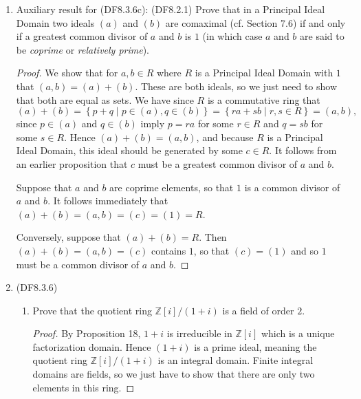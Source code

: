 \documentclass[11pt]{article}
\newcommand{\cbr}[1]{\left\{#1\right\}}
\begin{document}
\begin{enumerate}
\begin{proof}
        We show that $I = (\alpha/d^{\prime})$ for some $d^{\prime}\in D$ (any choice of a denominator would have been fine). It is clear that $(\alpha/d^{\prime})\subseteq I$ since $I$ is an ideal and multiples of $\alpha$ generate the numerators of fractions which appear in $I$. Any element $r/d\in I$ may be written in the form $s\alpha/d$ for some $s\in R$, and then by changing denominators we obtain $r/d = sd^{\prime}/d \cdot \alpha/d^{\prime}$, so that $r/d$ is equivalent to a multiple of $\alpha/d^{\prime}$. This implies that $I\subseteq (\alpha/d^{\prime})$ as desired, meaning that $I$ is a principal ideal. Since $I$ was arbitrary, it follows that $D^{-1}{R}$ is a Principal Ideal Domain.
    \end{proof}
    \item Auxiliary result for (DF8.3.6c): (DF8.2.1) Prove that in a Principal Ideal Domain two ideals $(a)$ and $(b)$ are comaximal (cf. Section 7.6) if and only if a greatest common divisor of $a$ and $b$ is $1$ (in which case $a$ and $b$ are said to be \textit{coprime} or \textit{relatively prime}).
    \begin{proof} We show that for $a,b\in R$ where $R$ is a Principal Ideal Domain with $1$ that $(a,b) = (a) + (b)$. These are both ideals, so we just need to show that both are equal as sets. We have since $R$ is a commutative ring that \[(a)+(b) = \cbr{p+q\mid p\in(a), q\in (b)} =\cbr{ra+sb\mid r,s\in R} = (a,b),\] since $p\in (a)$ and $q\in (b)$ imply $p = ra$ for some $r\in R$ and $q = sb$ for some $s\in R$. Hence $(a)+(b) = (a,b)$, and because $R$ is a Principal Ideal Domain, this ideal should be generated by some $c\in R$. It follows from an earlier proposition that $c$ must be a greatest common divisor of $a$ and $b$.

        Suppose that $a$ and $b$ are coprime elements, so that $1$ is a common divisor of $a$ and $b$. It follows immediately that $(a)+(b) = (a,b) = (c) = (1) = R$. 

        Conversely, suppose that $(a)+(b) = R$. Then $(a)+(b) = (a,b) = (c)$ contains $1$, so that $(c) = (1)$ and so $1$ must be a common divisor of $a$ and $b$.
    \end{proof}
    \item (DF8.3.6) \begin{enumerate}
        \item Prove that the quotient ring $\mathbb{Z}[i]/(1+i)$ is a field of order $2$.
        \begin{proof}
            By Proposition 18, $1+i$ is irreducible in $\mathbb{Z}[i]$ which is a unique factorization domain. Hence $(1+i)$ is a prime ideal, meaning the quotient ring $\mathbb{Z}[i]/(1+i)$ is an integral domain. Finite integral domains are fields, so we just have to show that there are only two elements in this ring.


\end{proof}
\end{enumerate}
\end{enumerate}
\end{document}
